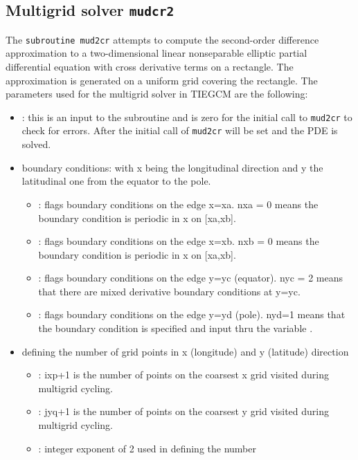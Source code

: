 \subsection{Multigrid solver \texttt{mudcr2}}\label{cap:mudsol}
%
The \texttt{subroutine mud2cr} attempts to compute
the second-order difference approximation to a two-dimensional
linear nonseparable elliptic partial differential equation with cross
derivative terms on a rectangle.  The approximation is generated on a
uniform grid covering the rectangle. The parameters used for the multigrid solver 
in TIEGCM are the following:
%
\begin{itemize}
  \item {}: this is an input to the subroutine and is zero for the initial
           call to \texttt{mud2cr} to check for errors. After the initial 
	   call of \texttt{mud2cr}  will be set and the PDE is solved.
  \item boundary conditions: with x being the longitudinal direction and y the
          latitudinal one from the equator to the pole.
  \begin{itemize}  
      \item {}: flags boundary conditions on the edge x=xa. nxa = 0
    		means the boundary condition is periodic in x on [xa,xb].
      \item {}: flags boundary conditions on the edge x=xb.  nxb = 0
    		means the boundary condition is periodic in x on [xa,xb].
      \item {}: flags boundary conditions on the edge y=yc (equator). nyc = 2 means
    		that there are mixed derivative boundary conditions at y=yc.
      \item {}: flags boundary conditions on the edge y=yd (pole). nyd=1 means
      that the boundary condition is specified and input thru the variable .
  \end{itemize}
  \item  defining the number
    	    of grid points in x (longitude) and y (latitude) direction
  \begin{itemize} 
    \item {}: ixp+1
  	    is the number of points on the coarsest x grid visited during
  	    multigrid cycling.
    \item {}: jyq+1 
  	    is the number of points on the coarsest y grid visited during
  	    multigrid cycling.
    \item {}: integer exponent of 2 used in defining the number

\end{itemize}
\end{itemize}
